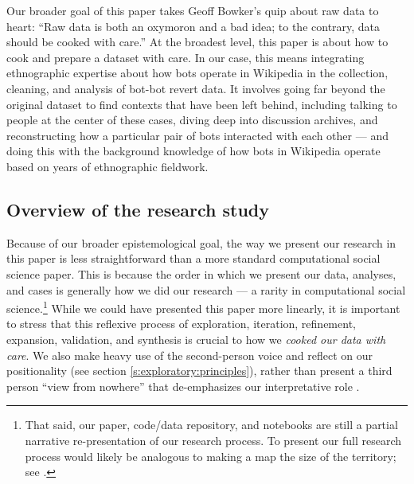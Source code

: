 \documentclass[format=acmsmall, review=false, screen=true]{acmart}%
\begin{document}
Our broader goal of this paper takes Geoff Bowker's quip about raw data to heart: ``Raw data is both an oxymoron and a bad idea; to the contrary, data should be cooked with care.'' \cite{Bowker2005} At the broadest level, this paper is about how to cook and prepare a dataset with care. In our case, this means integrating ethnographic expertise about how bots operate in Wikipedia in the collection, cleaning, and analysis of bot-bot revert data. It involves going far beyond the original dataset to find contexts that have been left behind, including talking to people at the center of these cases, diving deep into discussion archives, and reconstructing how a particular pair of bots interacted with each other --- and doing this with the background knowledge of how bots in Wikipedia operate based on years of ethnographic fieldwork. 

\subsection{Overview of the research study} \label{s:epist:overview}

Because of our broader epistemological goal, the way we present our research in this paper is less straightforward than a more standard computational social science paper. This is because the order in which we present our data, analyses, and cases is generally how we did our research --- a rarity in computational social science.\footnote{ That said, our paper, code/data repository, and notebooks are still a partial narrative re-presentation of our research process. To present our full research process would likely be analogous to making a map the size of the territory; see \citep{borges}.} While we could have presented this paper more linearly, it is important to stress that this reflexive process of exploration, iteration, refinement, expansion, validation, and synthesis is crucial to how we \emph{cooked our data with care}. We also make heavy use of the second-person voice and reflect on our positionality (see section \ref{s:exploratory:principles}), rather than present a third person ``view from nowhere'' that de-emphasizes our interpretative role \cite{Nagel1989,Haraway1988}. 
\end{document}
